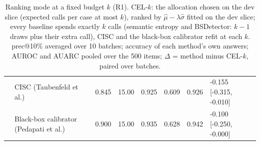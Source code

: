 \begin{table}[t]
\begin{tabular}{llrrrrrl}
 & CISC (Taubenfeld et al.) & 0.845 & 15.00 & 0.925 & 0.609 & 0.926 & -0.155 [-0.315, -0.010] \\
 & Black-box calibrator (Pedapati et al.) & 0.900 & 15.00 & 0.935 & 0.628 & 0.942 & -0.100 [-0.250, -0.000] \\
\bottomrule
\end{tabular}
\caption{Ranking mode at a fixed budget $k$ (R1). CEL-$k$: the allocation chosen on the dev slice (expected calls per case at most $k$), ranked by $\hat\mu - \lambda\hat\sigma$ fitted on the dev slice; every baseline spends exactly $k$ calls (semantic entropy and BSDetector: $k-1$ draws plus their extra call), CISC and the black-box calibrator refit at each $k$. prec@10\% averaged over 10 batches; accuracy of each method's own answers; AUROC and AUARC pooled over the 500 items; $\Delta$ = method minus CEL-$k$, paired over batches.}
\label{tab:budget_curve}
\end{table}

